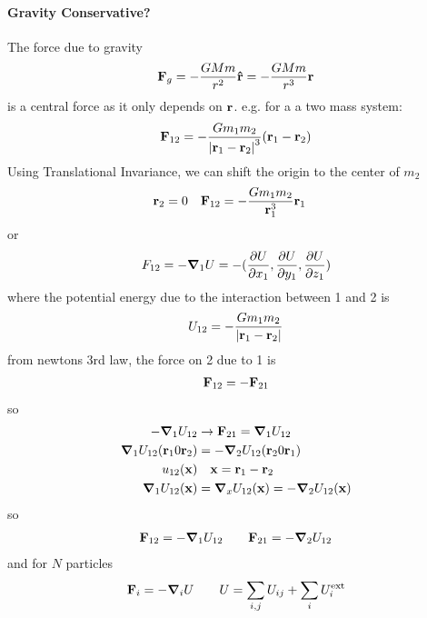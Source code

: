 \documentclass[../main.tex]{subfiles}
\begin{document}
\paragraph{Gravity Conservative?} The force due to gravity
\begin{align*}
    \vb{F}_g = -\frac{G M m}{r^2} \vu{r} = -\frac{G M m}{r^3} \vb{r}
\end{align*}
is a central force as it only depends on $\vb{r}$. e.g. for a a two mass system:
\begin{align*}
    \vb{F}_{12} = - \frac{G m_1 m_2}{\abs{\vb{r}_1 - \vb{r}_2}^3} (\vb{r}_1 - \vb{r}_2)
\end{align*}
Using Translational Invariance, we can shift the origin to the center of $m_2$
\begin{align*}
    \vb{r}_2 &= 0 \quad \vb{F}_{12} = - \frac{G m_1 m_2}{\vb{r}_1^3} \vb{r}_1
\end{align*}
or
\begin{align*}
    F_{12} = - \grad_1 U = - (\pdv{U}{x_1}, \pdv{U}{y_1}, \pdv{U}{z_1})
\end{align*}
where the potential energy due to the interaction between 1 and 2 is
\begin{align*}
    U_{12} = - \frac{G m_1 m_2}{\abs{\vb{r}_1 - \vb{r}_2}}
\end{align*}
from newtons 3rd law, the force on 2 due to 1 is
\begin{align*}
    \vb{F}_{12} = - \vb{F}_{21}
\end{align*}
so
\begin{align*}
    -\grad_1 U_{12} &\to \vb{F}_{21} = \grad_1 U_{12} \\
    \grad_1 U_{12} (\vb{r}_1 0 \vb{r}_2) &= - \grad_2 U_{12} (\vb{r}_2 0 \vb{r}_1) \\
    u_{12}(\vb{x}) &\quad \vb{x} = \vb{r}_1 - \vb{r}_2 \\
    \grad_1 U_{12}(\vb{x}) &= \grad_x U_{12}(\vb{x}) = - \grad_2 U_{12}(\vb{x})
\end{align*}
so
\begin{align*}
    \vb{F}_{12} = - \grad_1 U_{12} \qquad \vb{F}_{21} = - \grad_2 U_{12}
\end{align*}
and for $N$ particles
\begin{align*}
    \vb{F}_i = - \grad_i U \qquad U = \sum_{i,j} U_{ij} + \sum_i U_i^{\text{ext}}
\end{align*}
\end{document}
